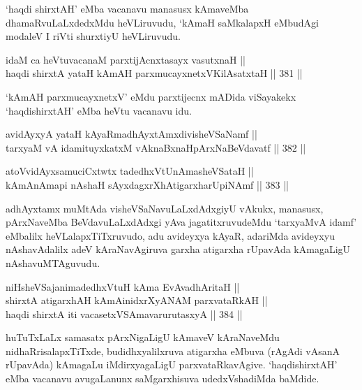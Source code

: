 \begin{artha}
`haqdi shirxtAH' eMba vacanavu manasusx kAmaveMba dhamaRvuLaLxdedxMdu
heVLiruvudu, `kAmaH saMkalapxH eMbudAgi modaleV I riVti shurxtiyU
heVLiruvudu.
\end{artha}

\begin{shl}
idaM ca heVtuvacanaM parxtijAcnxtasayx vasutxnaH || \\
haqdi shirxtA yataH kAmAH parxmucayxnetxV\s KilAsatxtaH \hfill || 381 ||  
\end{shl}

\begin{artha}
`kAmAH parxmucayxnetxV' eMdu parxtijecnx mADida viSayakekx
`haqdishirxtAH' eMba heVtu vacanavu idu.
\end{artha}

\begin{shl}
avidAyxyA yataH kAyaRmadhAyxtAmxdivisheVSaNamf || \\
tarxyaM vA idamituyxkatxM vAknaBxnaHpArxNaBeVdavatf \hfill || 382 ||  
\end{shl}

\begin{shl}
atoV\s vidAyxsamuciCxtwtx tadedhxVtUnAmasheVSataH || \\
kAmAnAmapi nAshaH sAyxdagxrXhAtigarxharUpiNAmf \hfill || 383 ||  
\end{shl}

\begin{artha}
adhAyxtamx muMtAda visheVSaNavuLaLxdAdxgiyU vAkukx, manasusx,
pArxNaveMba BeVdavuLaLxdAdxgi yAva jagatitxruvudeMdu `tarxyaMvA idamf'
eMbalilx heVLalapxTiTxruvudo, adu avideyxya kAyaR, adariMda avideyxyu
nAshavAdalilx adeV kAraNavAgiruva garxha atigarxha rUpavAda
kAmagaLigU nAshavuMTAguvudu.
\end{artha}

\begin{shl}
niHsheVSajanimadedhxVtuH kAma EvAvadhAritaH || \\
shirxtA atigarxhAH kAmAinidxrXyANAM parxvataRkAH || \\
haqdi shirxtA iti vacasetxVSAmavarurutasxyA \hfill || 384 ||  
\end{shl}

\begin{artha}
huTuTxLaLx samasatx pArxNigaLigU kAmaveV kAraNaveMdu
nidhaRrisalapxTiTxde, budidhxyalilxruva atigarxha eMbuva (rAgAdi
vAsanA rUpavAda) kAmagaLu iMdirxyagaLigU
parxvataRkavAgive. `haqdishirxtAH' eMba vacanavu avugaLanunx
saMgarxhisuva udedxVshadiMda baMdide. 
\end{artha}

